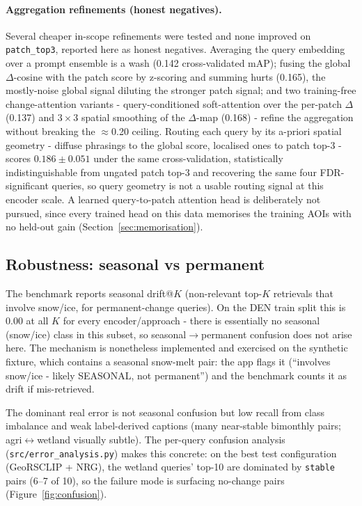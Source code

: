 \documentclass{article}
\begin{document}
\paragraph{Aggregation refinements (honest negatives).}
Several cheaper in-scope refinements were tested and none improved on
\texttt{patch\_top3}, reported here as honest negatives. Averaging the query
embedding over a prompt ensemble is a wash (0.142 cross-validated mAP); fusing
the global $\Delta$-cosine with the patch score by z-scoring and summing hurts
(0.165), the mostly-noise global signal diluting the stronger patch signal; and
two training-free change-attention variants - query-conditioned soft-attention
over the per-patch $\Delta$ (0.137) and $3\times3$ spatial smoothing of the
$\Delta$-map (0.168) - refine the aggregation without breaking the
$\approx$0.20 ceiling. Routing each query by its a-priori spatial geometry -
diffuse phrasings to the global score, localised ones to patch top-3 - scores
$0.186 \pm 0.051$ under the same cross-validation, statistically
indistinguishable from ungated patch top-3 and recovering the same four
FDR-significant queries, so query geometry is not a usable routing signal at this
encoder scale. A learned query-to-patch attention head is deliberately not
pursued, since every trained head on this data memorises the training AOIs with
no held-out gain (Section~\ref{sec:memorisation}).

\subsection{Robustness: seasonal vs permanent}
\label{sec:robustness}

The benchmark reports seasonal drift@$K$ (non-relevant top-$K$ retrievals that
involve snow/ice, for permanent-change queries). On the DEN train split this is
0.00 at all $K$ for every encoder/approach - there is essentially no seasonal
(snow/ice) class in this subset, so seasonal$\rightarrow$permanent confusion does
not arise here. The mechanism is nonetheless implemented and exercised on the
synthetic fixture, which contains a seasonal snow-melt pair: the app flags it
(``involves snow/ice - likely SEASONAL, not permanent'') and the benchmark
counts it as drift if mis-retrieved.

The dominant real error is not seasonal confusion but low recall from class
imbalance and weak label-derived captions (many near-stable bimonthly pairs;
agri$\leftrightarrow$wetland visually subtle). The per-query confusion analysis
(\texttt{src/error\_analysis.py}) makes this concrete: on the best test
configuration (GeoRSCLIP + NRG), the wetland queries' top-10 are dominated by
\texttt{stable} pairs (6--7 of 10), so the failure mode is surfacing no-change
pairs (Figure~\ref{fig:confusion}).
\end{document}

